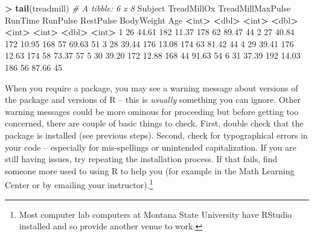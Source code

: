 \documentclass[]{book}
\newenvironment{Shaded}{\begin{snugshade}}{\end{snugshade}}
\newcommand{\CommentTok}[1]{\textcolor[rgb]{0.56,0.35,0.01}{\textit{#1}}}
\newcommand{\DecValTok}[1]{\textcolor[rgb]{0.00,0.00,0.81}{#1}}
\newcommand{\ErrorTok}[1]{\textcolor[rgb]{0.64,0.00,0.00}{\textbf{#1}}}
\newcommand{\FloatTok}[1]{\textcolor[rgb]{0.00,0.00,0.81}{#1}}
\newcommand{\KeywordTok}[1]{\textcolor[rgb]{0.13,0.29,0.53}{\textbf{#1}}}
\newcommand{\NormalTok}[1]{#1}
\newcommand{\OperatorTok}[1]{\textcolor[rgb]{0.81,0.36,0.00}{\textbf{#1}}}
\newcommand{\StringTok}[1]{\textcolor[rgb]{0.31,0.60,0.02}{#1}}
\let\rmarkdownfootnote\footnote%
\def\footnote{\protect\rmarkdownfootnote}
\renewcommand{\indent}{\hspace{15pt}}
\renewenvironment{Shaded}{%
\setlength{\FrameRule}{1.5pt}
\def\FrameCommand{\fboxrule=\FrameRule\fboxsep=5pt 
                  \fcolorbox{framecolor}{shadecolor}}%
\MakeFramed {\FrameRestore}}%
{\endMakeFramed}
\begin{document}
\begin{Shaded}
\begin{Highlighting}[]
\OperatorTok{>}\StringTok{ }\KeywordTok{tail}\NormalTok{(treadmill)}
\CommentTok{# A tibble: 6 x 8}
\NormalTok{  Subject TreadMillOx TreadMillMaxPulse RunTime RunPulse RestPulse BodyWeight   Age}
    \OperatorTok{<}\NormalTok{int}\OperatorTok{>}\StringTok{       }\ErrorTok{<}\NormalTok{dbl}\OperatorTok{>}\StringTok{             }\ErrorTok{<}\NormalTok{int}\OperatorTok{>}\StringTok{   }\ErrorTok{<}\NormalTok{dbl}\OperatorTok{>}\StringTok{    }\ErrorTok{<}\NormalTok{int}\OperatorTok{>}\StringTok{     }\ErrorTok{<}\NormalTok{int}\OperatorTok{>}\StringTok{      }\ErrorTok{<}\NormalTok{dbl}\OperatorTok{>}\StringTok{ }\ErrorTok{<}\NormalTok{int}\OperatorTok{>}
\DecValTok{1}      \DecValTok{26}       \FloatTok{44.61}               \DecValTok{182}   \FloatTok{11.37}      \DecValTok{178}        \DecValTok{62}      \FloatTok{89.47}    \DecValTok{44}
\DecValTok{2}      \DecValTok{27}       \FloatTok{40.84}               \DecValTok{172}   \FloatTok{10.95}      \DecValTok{168}        \DecValTok{57}      \FloatTok{69.63}    \DecValTok{51}
\DecValTok{3}      \DecValTok{28}       \FloatTok{39.44}               \DecValTok{176}   \FloatTok{13.08}      \DecValTok{174}        \DecValTok{63}      \FloatTok{81.42}    \DecValTok{44}
\DecValTok{4}      \DecValTok{29}       \FloatTok{39.41}               \DecValTok{176}   \FloatTok{12.63}      \DecValTok{174}        \DecValTok{58}      \FloatTok{73.37}    \DecValTok{57}
\DecValTok{5}      \DecValTok{30}       \FloatTok{39.20}               \DecValTok{172}   \FloatTok{12.88}      \DecValTok{168}        \DecValTok{44}      \FloatTok{91.63}    \DecValTok{54}
\DecValTok{6}      \DecValTok{31}       \FloatTok{37.39}               \DecValTok{192}   \FloatTok{14.03}      \DecValTok{186}        \DecValTok{56}      \FloatTok{87.66}    \DecValTok{45}
\end{Highlighting}
\end{Shaded}

\normalsize

\indent When you require a package, you may see a warning message about versions of the package and versions of
R -- this is \emph{usually} something you can ignore. Other warning messages could
be more ominous for proceeding but before getting too concerned, there are
couple of basic things to check.
First, double check that the package is
installed (see
previous steps). Second, check for typographical errors in your code --
especially for mis-spellings or unintended capitalization. If you are still
having issues, try repeating the installation process. If that fails, find
someone more used to using R to help you (for example in the Math Learning
Center or by emailing your instructor).\footnote{Most computer lab computers at
  Montana State University have RStudio installed and so provide another venue
  to work.}
\end{document}
